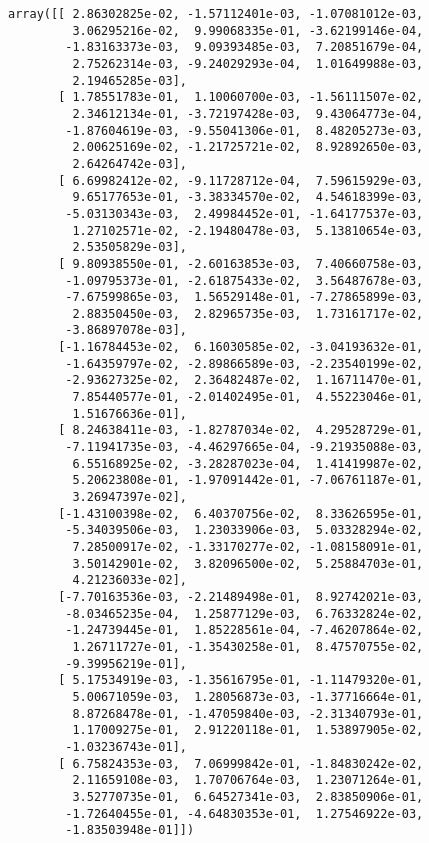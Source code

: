 \documentclass[11pt]{article}
\makeatletter
\newcommand{\boxspacing}{\kern\kvtcb@left@rule\kern\kvtcb@boxsep}
\newcommand{\prompt}[4]{
        {\ttfamily\llap{{\color{#2}[#3]:\hspace{3pt}#4}}\vspace{-\baselineskip}}
    }
\makeatother
\begin{document}
            \begin{tcolorbox}[breakable, size=fbox, boxrule=.5pt, pad at break*=1mm, opacityfill=0]
\prompt{Out}{outcolor}{19}{\boxspacing}
\begin{Verbatim}[commandchars=\\\{\}]
array([[ 2.86302825e-02, -1.57112401e-03, -1.07081012e-03,
         3.06295216e-02,  9.99068335e-01, -3.62199146e-04,
        -1.83163373e-03,  9.09393485e-03,  7.20851679e-04,
         2.75262314e-03, -9.24029293e-04,  1.01649988e-03,
         2.19465285e-03],
       [ 1.78551783e-01,  1.10060700e-03, -1.56111507e-02,
         2.34612134e-01, -3.72197428e-03,  9.43064773e-04,
        -1.87604619e-03, -9.55041306e-01,  8.48205273e-03,
         2.00625169e-02, -1.21725721e-02,  8.92892650e-03,
         2.64264742e-03],
       [ 6.69982412e-02, -9.11728712e-04,  7.59615929e-03,
         9.65177653e-01, -3.38334570e-02,  4.54618399e-03,
        -5.03130343e-03,  2.49984452e-01, -1.64177537e-03,
         1.27102571e-02, -2.19480478e-03,  5.13810654e-03,
         2.53505829e-03],
       [ 9.80938550e-01, -2.60163853e-03,  7.40660758e-03,
        -1.09795373e-01, -2.61875433e-02,  3.56487678e-03,
        -7.67599865e-03,  1.56529148e-01, -7.27865899e-03,
         2.88350450e-03,  2.82965735e-03,  1.73161717e-02,
        -3.86897078e-03],
       [-1.16784453e-02,  6.16030585e-02, -3.04193632e-01,
        -1.64359797e-02, -2.89866589e-03, -2.23540199e-02,
        -2.93627325e-02,  2.36482487e-02,  1.16711470e-01,
         7.85440577e-01, -2.01402495e-01,  4.55223046e-01,
         1.51676636e-01],
       [ 8.24638411e-03, -1.82787034e-02,  4.29528729e-01,
        -7.11941735e-03, -4.46297665e-04, -9.21935088e-03,
         6.55168925e-02, -3.28287023e-04,  1.41419987e-02,
         5.20623808e-01, -1.97091442e-01, -7.06761187e-01,
         3.26947397e-02],
       [-1.43100398e-02,  6.40370756e-02,  8.33626595e-01,
        -5.34039506e-03,  1.23033906e-03,  5.03328294e-02,
         7.28500917e-02, -1.33170277e-02, -1.08158091e-01,
         3.50142901e-02,  3.82096500e-02,  5.25884703e-01,
         4.21236033e-02],
       [-7.70163536e-03, -2.21489498e-01,  8.92742021e-03,
        -8.03465235e-04,  1.25877129e-03,  6.76332824e-02,
        -1.24739445e-01,  1.85228561e-04, -7.46207864e-02,
         1.26711727e-01, -1.35430258e-01,  8.47570755e-02,
        -9.39956219e-01],
       [ 5.17534919e-03, -1.35616795e-01, -1.11479320e-01,
         5.00671059e-03,  1.28056873e-03, -1.37716664e-01,
         8.87268478e-01, -1.47059840e-03, -2.31340793e-01,
         1.17009275e-01,  2.91220118e-01,  1.53897905e-02,
        -1.03236743e-01],
       [ 6.75824353e-03,  7.06999842e-01, -1.84830242e-02,
         2.11659108e-03,  1.70706764e-03,  1.23071264e-01,
         3.52770735e-01,  6.64527341e-03,  2.83850906e-01,
        -1.72640455e-01, -4.64830353e-01,  1.27546922e-03,
        -1.83503948e-01]])
\end{Verbatim}
\end{tcolorbox}
        
\end{document}
